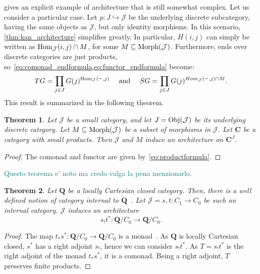\documentclass[12pt]{article}
\newtheorem{theorem}{Theorem}
\newcommand{\pietro}[1]{\textcolor{teal}{#1}}
\newcommand{\Hom}{{\textnormal{Hom}}}
\newcommand{\Obj}{{\textnormal{Obj}}}
\newcommand{\Morph}{{\textnormal{Morph}}}
\newcommand{\Cat}{{\mathbf{C}}}
\newcommand{\JCat}{{\mathcal{J}}}
\newcommand{\QCat}{{\mathbf{Q}}}
\newcommand{\anon}{{\,\mbox{-}\,}}
\begin{document}
 gives an explicit example of architecture that is still somewhat complex. Let us consider a particular case. Let  $p\colon J \hookrightarrow \JCat$ be the underlying discrete subcategory, having the same objects as $\JCat$, but only identity morphisms. In this scenario, \cref{thm:kan_architecture} simplifies greatly. In particular, $H(i, j)$ can simply be written as $\Hom_\JCat(i, j) \cap M$, for some $M \subseteq \Morph(\JCat)$. Furthermore, ends over discrete categories are just products, so~\cref{eq:comonad_endformula,eq:functor_endformula} become:
\begin{equation}\label{eq:productformula}
    T G = \prod_{j \in J} G(j)^{\Hom_\JCat(\anon, j)}
    \quad\text{ and }\quad
    S G = \prod_{j \in J} G(j)^{Hom_\JCat(\anon, j) \cap M}.
\end{equation}
This result is summarized in the following theorem.

\begin{theorem}\label{thm:discrete_kan_architecture}
    Let $\JCat$ be a small category, and let $J = \Obj(\JCat)$ be its underlying discrete category. Let $M \subseteq \Morph(\JCat)$ be a subset of morphisms in $\JCat$. Let $\Cat$ be a category with small products. Then $\JCat$ and $M$ induce an architecture on $\Cat^J$.
\end{theorem}

\begin{proof}
    The comonad and functor are given by~\cref{eq:productformula}.
\end{proof}

\pietro{Questo teorema e' noto ma credo valga la pena menzionarlo.}

\begin{theorem}\label{thm:categorical_architecture}
    Let $\QCat$ be a locally Cartesian closed category. Then, there is a well defined notion of category {\em internal} to $\QCat$~\cite{mac2013categories}.
    Let $\JCat = s, t \colon C_1 \rightarrow C_0$ be such an internal category. $\JCat$ induces an architecture
    \begin{equation*}
        s_!t^*\colon \QCat/C_0 \rightarrow \QCat/C_0.
    \end{equation*}
\end{theorem}

\begin{proof}
    The map $t_*s^*\colon \QCat/C_0 \rightarrow \QCat/C_0$ is a monad~\cite[Thm.~V.8.2]{Mac_Lane_1994}. As $\QCat$ is locally Cartesian closed, $s^*$ has a right adjoint $s_!$, hence we can consider $s_!t^*$. As $T = s_!t^*$ is the right adjoint of the monad $t_*s^*$, it is a comonad. Being a right adjoint, $T$ preserves finite products.
\end{proof}
\end{document}
